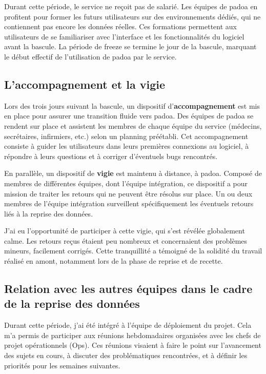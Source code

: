 Durant cette période, le service ne reçoit pas de salarié. Les équipes de padoa en profitent pour former les futurs utilisateurs sur des environnements dédiés, qui ne contiennent pas encore les données réelles. Ces formations permettent aux utilisateurs de se familiariser avec l’interface et les fonctionnalités du logiciel avant la bascule. La période de freeze se termine le jour de la bascule, marquant le début effectif de l’utilisation de padoa par le service.

\subsection{L'accompagnement et la vigie}

Lors des trois jours suivant la bascule, un dispositif d’\textbf{accompagnement} est mis en place pour assurer une transition fluide vers padoa. Des équipes de padoa se rendent sur place et assistent les membres de chaque équipe du service (médecins, secrétaires, infirmiers, etc.) selon un planning préétabli. Cet accompagnement consiste à guider les utilisateurs dans leurs premières connexions au logiciel, à répondre à leurs questions et à corriger d’éventuels bugs rencontrés.

En parallèle, un dispositif de \textbf{vigie} est maintenu à distance, à padoa. Composé de membres de différentes équipes, dont l’équipe intégration, ce dispositif a pour mission de traiter les retours qui ne peuvent être résolus sur place. Un ou deux membres de l’équipe intégration surveillent spécifiquement les éventuels retours liés à la reprise des données. 

J’ai eu l’opportunité de participer à cette vigie, qui s’est révélée globalement calme. Les retours reçus étaient peu nombreux et concernaient des problèmes mineurs, facilement corrigés. Cette tranquillité a témoigné de la solidité du travail réalisé en amont, notamment lors de la phase de reprise et de recette.


\subsection{Relation avec les autres équipes dans le cadre de la reprise des données}

Durant cette période, j’ai été intégré à l’équipe de déploiement du projet. Cela m’a permis de participer aux réunions hebdomadaires organisées avec les chefs de projet opérationnels (Ops). Ces réunions visaient à faire le point sur l’avancement des sujets en cours, à discuter des problématiques rencontrées, et à définir les priorités pour les semaines suivantes.

